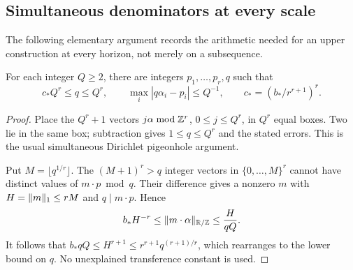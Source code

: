 \subsection{Simultaneous denominators at every scale}
The following elementary argument records the arithmetic needed for an upper construction at every horizon, not merely on a subsequence.
\begin{lemma}\label{lem:denominator}
For each integer $Q\ge2$, there are integers $p_1,\ldots,p_r,q$ such that
\begin{equation}\label{eq:denominator}
 c_*Q^r\le q\le Q^r,\qquad
 \max_i|q\alpha_i-p_i|\le Q^{-1},\qquad
 c_*=(b_*/r^{r+1})^r.
\end{equation}
\end{lemma}
\begin{proof}
Place the $Q^r+1$ vectors $j\alpha\bmod\mathbb Z^r$, $0\le j\le Q^r$, in $Q^r$ equal boxes. Two lie in the same box; subtraction gives $1\le q\le Q^r$ and the stated errors. This is the usual simultaneous Dirichlet pigeonhole argument.

Put $M=\lfloor q^{1/r}\rfloor$. The $(M+1)^r>q$ integer vectors in $\{0,\ldots,M\}^r$ cannot have distinct values of $m\cdot p\bmod q$. Their difference gives a nonzero $m$ with $H=\lVert m\rVert_1\le rM$ and $q\mid m\cdot p$. Hence
\[
 b_*H^{-r}\le\lVert m\cdot\alpha\rVert_{\mathbb R/\mathbb Z}
   \le\frac{H}{qQ}.
\]
It follows that $b_*qQ\le H^{r+1}\le r^{r+1}q^{(r+1)/r}$, which rearranges to the lower bound on $q$. No unexplained transference constant is used.
\end{proof}

